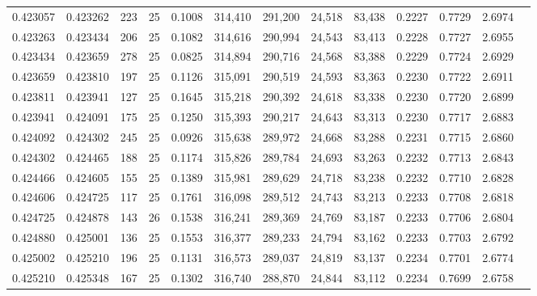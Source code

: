 \begin{tabular}{rrrrrrrrrrrrr}
0.423057 & 0.423262 &   223 &  25 &                                     0.1008 & 314,410 & 291,200 &  24,518 &  83,438 & 0.2227 & 0.7729 & 2.6974 \\
0.423263 & 0.423434 &   206 &  25 &                                     0.1082 & 314,616 & 290,994 &  24,543 &  83,413 & 0.2228 & 0.7727 & 2.6955 \\
0.423434 & 0.423659 &   278 &  25 &                                     0.0825 & 314,894 & 290,716 &  24,568 &  83,388 & 0.2229 & 0.7724 & 2.6929 \\
0.423659 & 0.423810 &   197 &  25 &                                     0.1126 & 315,091 & 290,519 &  24,593 &  83,363 & 0.2230 & 0.7722 & 2.6911 \\
0.423811 & 0.423941 &   127 &  25 &                                     0.1645 & 315,218 & 290,392 &  24,618 &  83,338 & 0.2230 & 0.7720 & 2.6899 \\
0.423941 & 0.424091 &   175 &  25 &                                     0.1250 & 315,393 & 290,217 &  24,643 &  83,313 & 0.2230 & 0.7717 & 2.6883 \\
0.424092 & 0.424302 &   245 &  25 &                                     0.0926 & 315,638 & 289,972 &  24,668 &  83,288 & 0.2231 & 0.7715 & 2.6860 \\
0.424302 & 0.424465 &   188 &  25 &                                     0.1174 & 315,826 & 289,784 &  24,693 &  83,263 & 0.2232 & 0.7713 & 2.6843 \\
0.424466 & 0.424605 &   155 &  25 &                                     0.1389 & 315,981 & 289,629 &  24,718 &  83,238 & 0.2232 & 0.7710 & 2.6828 \\
0.424606 & 0.424725 &   117 &  25 &                                     0.1761 & 316,098 & 289,512 &  24,743 &  83,213 & 0.2233 & 0.7708 & 2.6818 \\
0.424725 & 0.424878 &   143 &  26 &                                     0.1538 & 316,241 & 289,369 &  24,769 &  83,187 & 0.2233 & 0.7706 & 2.6804 \\
0.424880 & 0.425001 &   136 &  25 &                                     0.1553 & 316,377 & 289,233 &  24,794 &  83,162 & 0.2233 & 0.7703 & 2.6792 \\
0.425002 & 0.425210 &   196 &  25 &                                     0.1131 & 316,573 & 289,037 &  24,819 &  83,137 & 0.2234 & 0.7701 & 2.6774 \\
0.425210 & 0.425348 &   167 &  25 &                                     0.1302 & 316,740 & 288,870 &  24,844 &  83,112 & 0.2234 & 0.7699 & 2.6758 \\

\end{tabular}
